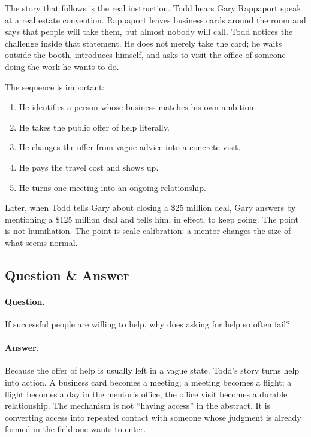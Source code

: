 The story that follows is the real instruction. Todd hears Gary Rappaport speak at a real estate convention. Rappaport leaves business cards around the room and says that people will take them, but almost nobody will call. Todd notices the challenge inside that statement. He does not merely take the card; he waits outside the booth, introduces himself, and asks to visit the office of someone doing the work he wants to do.

The sequence is important:
\begin{enumerate}
\item He identifies a person whose business matches his own ambition.
\item He takes the public offer of help literally.
\item He changes the offer from vague advice into a concrete visit.
\item He pays the travel cost and shows up.
\item He turns one meeting into an ongoing relationship.
\end{enumerate}

Later, when Todd tells Gary about closing a \$25 million deal, Gary answers by mentioning a \$125 million deal and tells him, in effect, to keep going. The point is not humiliation. The point is scale calibration: a mentor changes the size of what seems normal.

\subsection{Question \& Answer}

\paragraph{Question.}
If successful people are willing to help, why does asking for help so often fail?

\paragraph{Answer.}
Because the offer of help is usually left in a vague state. Todd's story turns help into action. A business card becomes a meeting; a meeting becomes a flight; a flight becomes a day in the mentor's office; the office visit becomes a durable relationship. The mechanism is not ``having access'' in the abstract. It is converting access into repeated contact with someone whose judgment is already formed in the field one wants to enter.

